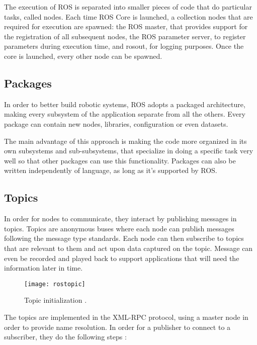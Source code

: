 The execution of ROS is separated into smaller pieces of code that do particular tasks, called nodes. Each time ROS Core is launched, a collection nodes that are required for execution are spawned: the ROS master, that provides support for the registration of all subsequent nodes, the ROS parameter server, to register parameters during execution time, and rosout, for logging purposes. Once the core is launched, every other node can be spawned.

\subsection{Packages}

In order to better build robotic systems, ROS adopts a packaged architecture, making every subsystem of the application separate from all the others. Every package can contain new nodes, libraries, configuration or even datasets.

The main advantage of this approach is making the code more organized in its own subsystems and sub-subsystems, that specialize in doing a specific task very well so that other packages can use this functionality. Packages can also be written independently of language, as long as it's supported by ROS.

\subsection{Topics}

In order for nodes to communicate, they interact by publishing messages in topics. Topics are anonymous buses where each node can publish messages following the message type standards. Each node can then subscribe to topics that are relevant to them and act upon data captured on the topic. Message can even be recorded and played back to support applications that will need the information later in time.

\begin{figure}[!ht]
\centering
\texttt{[image: rostopic]}
\caption{Topic initialization \cite{rosoverview}.}
\label{fig:rostopic}
\end{figure}

The topics are implemented in the XML-RPC protocol, using a master node in order to provide name resolution. In order for a publisher to connect to a subscriber, they do the following steps \cite{rosoverview}:

